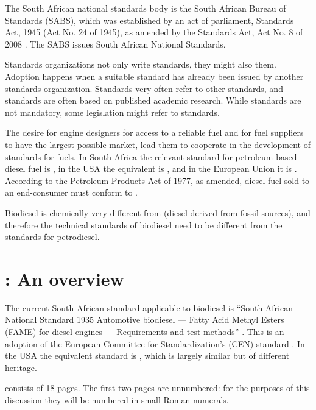 The South African national standards body is the South African Bureau of
Standards (SABS), which was established by an act of parliament,
 Standards Act, 1945 (Act No. 24 of 1945), as amended by the Standards Act, Act
 No. 8 of 2008 \autocite{Act8-2008}. The SABS issues South African National
 Standards.

Standards organizations not only write standards, they might also
 them. Adoption happens when a suitable standard has already been
issued by another standards organization. Standards very often refer to other
standards, and standards are often based on published academic research. While
standards are not mandatory, some legislation might refer to standards.

The desire for engine designers for access to a reliable fuel and for fuel
suppliers to have the largest possible market, lead them to cooperate in the
development of standards for fuels. In South Africa the relevant standard for
petroleum-based diesel fuel is , in the USA the equivalent is
, and in the European Union it is . According to the
Petroleum Products Act of 1977, as amended, diesel fuel sold to an end-consumer
must conform to .

Biodiesel is chemically very different from  (diesel
derived from fossil sources), and therefore the technical standards of biodiesel
need to be different from the standards for petrodiesel.

\section{\texorpdfstring{}{SANS 1935}: An overview}

The current South African standard applicable to biodiesel is ``South African
National Standard 1935 Automotive biodiesel — Fatty Acid Methyl Esters (FAME)
for diesel engines — Requirements and test methods'' \autocite{SANS1935}. This
is an adoption of the European Committee for Standardization's (CEN) standard
 \autocite{EN14214}. In the USA the equivalent standard is
, which is largely similar but of different heritage.

 consists of 18 pages. The first two pages are unnumbered: for
the purposes of this discussion they will be numbered in small Roman numerals.

